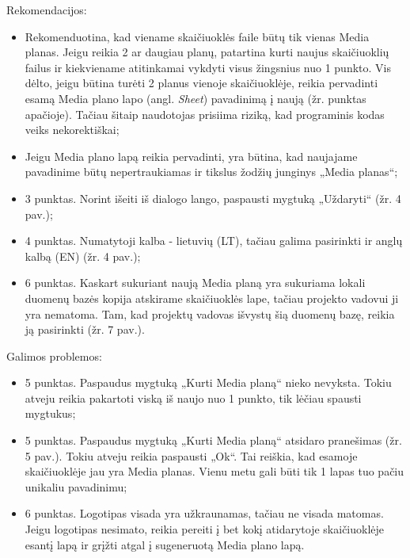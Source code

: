 \bigskip
Rekomendacijos:
\begin{itemize}
    \itemsep0em 
    \item Rekomenduotina, kad viename skaičiuoklės faile būtų tik vienas Media planas. Jeigu reikia 2 ar daugiau planų, patartina kurti naujus skaičiuoklių failus ir kiekviename atitinkamai vykdyti visus žingsnius nuo 1 punkto. Vis dėlto, jeigu būtina turėti 2 planus vienoje skaičiuoklėje, reikia pervadinti esamą Media plano lapo (angl. \textit{Sheet}) pavadinimą į naują (žr. punktas apačioje). Tačiau šitaip naudotojas prisiima riziką, kad programinis kodas veiks nekorektiškai;
    \item Jeigu Media plano lapą reikia pervadinti, yra būtina, kad naujajame pavadinime būtų nepertraukiamas ir tikslus žodžių junginys „Media planas“;
    \item 3 punktas. Norint išeiti iš dialogo lango, paspausti mygtuką „Uždaryti“ (žr. 4 pav.);
    \item 4 punktas. Numatytoji kalba - lietuvių (LT), tačiau galima pasirinkti ir anglų kalbą (EN) (žr. 4 pav.);
    \item 6 punktas. Kaskart sukuriant naują Media planą yra sukuriama lokali duomenų bazės kopija atskirame skaičiuoklės lape, tačiau projekto vadovui ji yra nematoma. Tam, kad projektų vadovas išvystų šią duomenų bazę, reikia ją pasirinkti (žr. 7 pav.). 
\end{itemize}

\bigskip
Galimos problemos:
\begin{itemize}
    \itemsep0em 
    \item 5 punktas. Paspaudus mygtuką „Kurti Media planą“ nieko nevyksta. Tokiu atveju reikia pakartoti viską iš naujo nuo 1 punkto, tik lėčiau spausti mygtukus;
    \item 5 punktas. Paspaudus mygtuką „Kurti Media planą“ atsidaro pranešimas (žr. 5 pav.). Tokiu atveju reikia paspausti „Ok“. Tai reiškia, kad esamoje skaičiuoklėje jau yra Media planas. Vienu metu gali būti tik 1 lapas tuo pačiu unikaliu pavadinimu;
    \item 6 punktas. Logotipas visada yra užkraunamas, tačiau ne visada matomas. Jeigu logotipas nesimato, reikia pereiti į bet kokį atidarytoje skaičiuoklėje esantį lapą ir grįžti atgal į sugeneruotą Media plano lapą.
\end{itemize}

